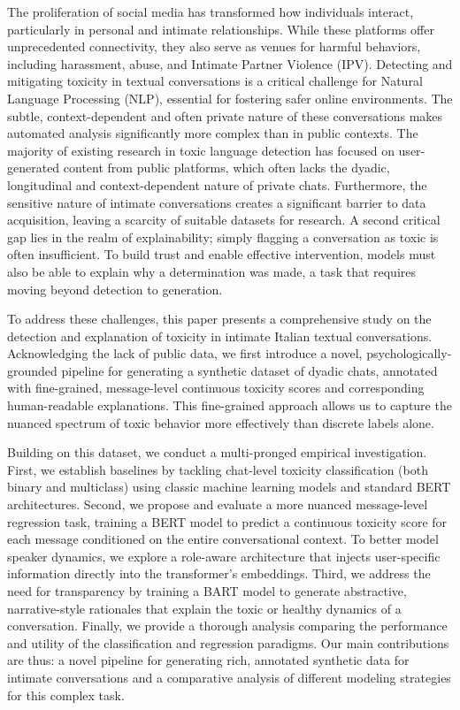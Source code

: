 \documentclass[twocolumn]{ceurart}
\begin{document}
The proliferation of social media has transformed how individuals interact, particularly in personal and intimate relationships. While these platforms offer unprecedented connectivity, they also serve as venues for harmful behaviors, including harassment, abuse, and Intimate Partner Violence (IPV). Detecting and mitigating toxicity in textual conversations is a critical challenge for Natural Language Processing (NLP), essential for fostering safer online environments. The subtle, context-dependent and often private nature of these conversations makes automated analysis significantly more complex than in public contexts. The majority of existing research in toxic language detection has focused on user-generated content from public platforms, which often lacks the dyadic, longitudinal and context-dependent nature of private chats. Furthermore, the sensitive nature of intimate conversations creates a significant barrier to data acquisition, leaving a scarcity of suitable datasets for research. A second critical gap lies in the realm of explainability; simply flagging a conversation as toxic is often insufficient. To build trust and enable effective intervention, models must also be able to explain why a determination was made, a task that requires moving beyond detection to generation.

To address these challenges, this paper presents a comprehensive study on the detection and explanation of toxicity in intimate Italian textual conversations. Acknowledging the lack of public data, we first introduce a novel, psychologically-grounded pipeline for generating a synthetic dataset of dyadic chats, annotated with fine-grained, message-level continuous toxicity scores and corresponding human-readable explanations. This fine-grained approach allows us to capture the nuanced spectrum of toxic behavior more effectively than discrete labels alone.

Building on this dataset, we conduct a multi-pronged empirical investigation. First, we establish baselines by tackling chat-level toxicity classification (both binary and multiclass) using classic machine learning models and standard BERT architectures. Second, we propose and evaluate a more nuanced message-level regression task, training a BERT model to predict a continuous toxicity score for each message conditioned on the entire conversational context. To better model speaker dynamics, we explore a role-aware architecture that injects user-specific information directly into the transformer's embeddings. Third, we address the need for transparency by training a BART model to generate abstractive, narrative-style rationales that explain the toxic or healthy dynamics of a conversation. Finally, we provide a thorough analysis comparing the performance and utility of the classification and regression paradigms. Our main contributions are thus: a novel pipeline for generating rich, annotated synthetic data for intimate conversations and a comparative analysis of different modeling strategies for this complex task.
\end{document}
